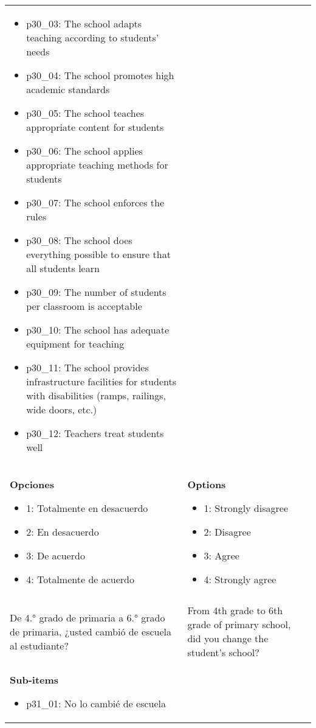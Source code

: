 \documentclass[11pt]{article}
\begin{document}
\begin{longtable}{@{}LL@{}}
\begin{itemize}[leftmargin=*]
\item p30\_03: The school adapts teaching according to students' needs
\item p30\_04: The school promotes high academic standards
\item p30\_05: The school teaches appropriate content for students
\item p30\_06: The school applies appropriate teaching methods for students
\item p30\_07: The school enforces the rules
\item p30\_08: The school does everything possible to ensure that all students learn
\item p30\_09: The number of students per classroom is acceptable
\item p30\_10: The school has adequate equipment for teaching
\item p30\_11: The school provides infrastructure facilities for students with disabilities (ramps, railings, wide doors, etc.)
\item p30\_12: Teachers treat students well\end{itemize} \\
\textbf{Opciones}\par\begin{itemize}[leftmargin=*]\item 1: Totalmente en desacuerdo
\item 2: En desacuerdo
\item 3: De acuerdo
\item 4: Totalmente de acuerdo\end{itemize} & \textbf{Options}\par\begin{itemize}[leftmargin=*]\item 1: Strongly disagree
\item 2: Disagree
\item 3: Agree
\item 4: Strongly agree\end{itemize} \\
\addlinespace[4pt]
 \\ 
De 4.° grado de primaria a 6.° grado de primaria, ¿usted cambió de escuela al estudiante? & From 4th grade to 6th grade of primary school, did you change the student's school? \\
\textbf{Sub-items}\par\begin{itemize}[leftmargin=*]\item p31\_01: No lo cambié de escuela

\end{itemize}
\end{longtable}
\end{document}
